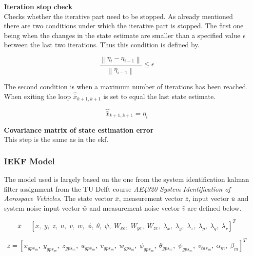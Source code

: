 \begin{enumerate}
{{    \item \textbf{Iteration stop check}\\
    Checks whether the iterative part need to be stopped. As already mentioned there are two conditions under which the iterative part is stopped. The first one being when the changes in the state estimate are smaller than a specified value $\epsilon$ between the last two iterations. Thus this condition is defined by.

    \begin{equation}
        \frac{{\left\| {{\eta _i} - {\eta _{i - 1}}} \right\|}}{{\left\| {{\eta _{i - 1}}} \right\|}} \le \epsilon
    \end{equation}

    The second condition is when a maximum number of iterations has been reached.
    When exiting the loop ${{\hat{\bar x}}_{k + 1,k + 1}}$  is set to equal the last state estimate.

    \begin{equation}
        {{\hat{\bar x}}_{k + 1,k + 1}} = {\eta _i}
    \end{equation}

    }}
    \item \textbf{Covariance matrix of state estimation error}\\
    This step is the same as in the \gls{ekf}.
\end{enumerate}


\subsubsection{IEKF Model}
The model used is largely based on the one from the system identification kalman filter assignment from the TU Delft course \textit{AE4320 System Identification of Aerospace Vehicles}. The state vector $\bar x$, measurement vector $\bar z$, input vector $\bar u$ and system noise input vector $\bar w$ and measurement noise vector $\bar v$ are defined below.


\begin{equation}
    \bar x =  \left [ x, \; y, \; z, \; u, \; v, \; w, \; \phi, \; \theta, \; \psi, \; W_{xe}, \; W_{ye}, \; W_{ze}, \; \lambda_{x}, \; \lambda_{y}, \; \lambda_{z}, \; \lambda_{p}, \; \lambda_{q}, \; \lambda_{r}\right ]
    ^T
\end{equation}

\begin{equation}
    \bar z = \left [ x_{gps_m}, \; y_{gps_m}, \; z_{gps_m}, \; u_{gps_m}, \; v_{gps_m}, \; w_{gps_m}, \; \phi_{gps_m}, \; \theta_{gps_m}, \; \psi_{gps_m}, \; v_{tas_m}, \; \alpha_m, \; \beta_m\right ]
    ^T
\end{equation}

